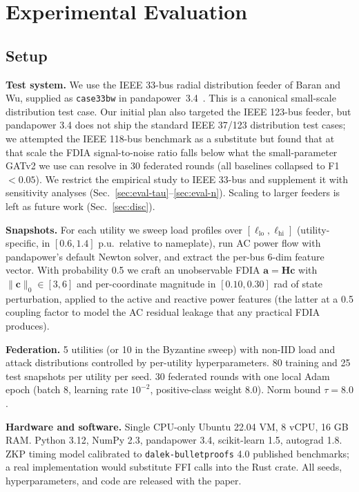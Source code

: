 \documentclass[conference]{IEEEtran}
\begin{document}
\section{Experimental Evaluation}
\label{sec:eval}

\subsection{Setup}
\label{sec:eval-setup}
\textbf{Test system.} We use the IEEE 33-bus radial distribution feeder of Baran and Wu, supplied as \texttt{case33bw} in pandapower~3.4~\cite{thurner2018pandapower}. This is a canonical small-scale distribution test case. Our initial plan also targeted the IEEE 123-bus feeder, but pandapower 3.4 does not ship the standard IEEE 37/123 distribution test cases; we attempted the IEEE 118-bus benchmark as a substitute but found that at that scale the FDIA signal-to-noise ratio falls below what the small-parameter GATv2 we use can resolve in 30 federated rounds (all baselines collapsed to F1$<0.05$). We restrict the empirical study to IEEE 33-bus and supplement it with sensitivity analyses (Sec.~\ref{sec:eval-tau}--\ref{sec:eval-n}). Scaling to larger feeders is left as future work (Sec.~\ref{sec:disc}).

\textbf{Snapshots.} For each utility we sweep load profiles over $[\ell_{\mathrm{lo}}, \ell_{\mathrm{hi}}]$ (utility-specific, in $[0.6, 1.4]$ p.u.\ relative to nameplate), run AC power flow with pandapower's default Newton solver, and extract the per-bus 6-dim feature vector. With probability 0.5 we craft an unobservable FDIA $\mathbf{a}=\mathbf{H}\mathbf{c}$ with $\|\mathbf{c}\|_0 \in [3,6]$ and per-coordinate magnitude in $[0.10, 0.30]$ rad of state perturbation, applied to the active and reactive power features (the latter at a 0.5 coupling factor to model the AC residual leakage that any practical FDIA produces).

\textbf{Federation.} 5 utilities (or 10 in the Byzantine sweep) with non-IID load and attack distributions controlled by per-utility hyperparameters. 80 training and 25 test snapshots per utility per seed. 30 federated rounds with one local Adam epoch (batch 8, learning rate $10^{-2}$, positive-class weight 8.0). Norm bound $\tau=8.0$.

\textbf{Hardware and software.} Single CPU-only Ubuntu 22.04 VM, 8 vCPU, 16 GB RAM. Python 3.12, NumPy 2.3, pandapower 3.4, scikit-learn 1.5, autograd 1.8. ZKP timing model calibrated to \texttt{dalek-bulletproofs} 4.0 published benchmarks; a real implementation would substitute FFI calls into the Rust crate. All seeds, hyperparameters, and code are released with the paper.
\end{document}
